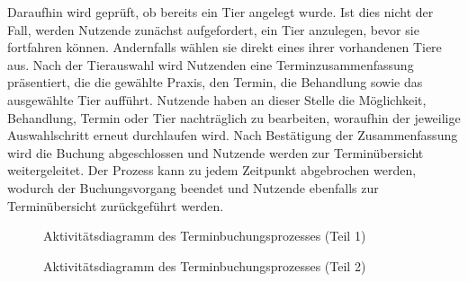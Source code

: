 Daraufhin wird geprüft, ob bereits ein Tier angelegt wurde. Ist dies nicht der Fall, werden Nutzende zunächst aufgefordert, ein Tier anzulegen, bevor sie fortfahren können. Andernfalls wählen sie direkt eines ihrer vorhandenen Tiere aus.
Nach der Tierauswahl wird Nutzenden eine Terminzusammenfassung präsentiert, die die gewählte Praxis, den Termin, die Behandlung sowie das ausgewählte Tier aufführt. Nutzende haben an dieser
Stelle die Möglichkeit, Behandlung, Termin oder Tier nachträglich zu bearbeiten, woraufhin der jeweilige Auswahlschritt erneut durchlaufen wird. Nach Bestätigung der Zusammenfassung wird
die Buchung abgeschlossen und Nutzende werden zur Terminübersicht weitergeleitet. Der Prozess kann zu jedem Zeitpunkt abgebrochen werden, wodurch der Buchungsvorgang beendet und Nutzende ebenfalls zur Terminübersicht zurückgeführt werden.


\begin{landscape}
\begin{figure}[H]
    \centering
    
    \caption{Aktivitätsdiagramm des Terminbuchungsprozesses (Teil 1)}
    \label{fig:aktivitaet-buchung-1}
\end{figure}
\end{landscape}
\clearpage
\begin{landscape}
\begin{figure}[H]
    \centering
    
    \caption{Aktivitätsdiagramm des Terminbuchungsprozesses (Teil 2)}
    \label{fig:aktivitaet-buchung-2}
\end{figure}
\end{landscape}
